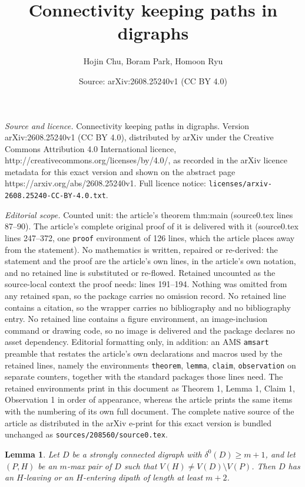 \documentclass[10pt,a4paper]{amsart}
\title{Connectivity keeping paths in digraphs}
\author{Hojin Chu, Boram Park, Homoon Ryu}
\date{Source: arXiv:2608.25240v1 (CC BY 4.0)}
\newtheorem{lemma}{Lemma}
\begin{document}
\maketitle

\noindent\emph{Source and licence.} Connectivity keeping paths in digraphs. Version arXiv:2608.25240v1 (CC BY 4.0), distributed by arXiv under the Creative Commons Attribution 4.0 International licence, http://creativecommons.org/licenses/by/4.0/, as recorded in the arXiv licence metadata for this exact version and shown on the abstract page https://arxiv.org/abs/2608.25240v1. Full licence notice: \texttt{licenses/arxiv-2608.25240-CC-BY-4.0.txt}.\par\smallskip

\noindent\textit{Editorial scope.} Counted unit: the article's theorem thm:main (source0.tex lines 87--90). The article's complete original proof of it is delivered with it (source0.tex lines 247--372, one \texttt{proof} environment of 126 lines, which the article places away from the statement). No mathematics is written, repaired or re-derived: the statement and the proof are the article's own lines, in the article's own notation, and no retained line is substituted or re-flowed.  Retained uncounted as the source-local context the proof needs: lines 191--194.  Nothing was omitted from any retained span, so the package carries no omission record.  No retained line contains a citation, so the wrapper carries no bibliography and no bibliography entry.  No retained line contains a figure environment, an image-inclusion command or drawing code, so no image is delivered and the package declares no asset dependency.  Editorial formatting only, in addition: an AMS \texttt{amsart} preamble that restates the article's own declarations and macros used by the retained lines, namely the environments \texttt{theorem}, \texttt{lemma}, \texttt{claim}, \texttt{observation} on separate counters, together with the standard packages those lines need.  The retained environments print in this document as Theorem 1, Lemma 1, Claim 1, Observation 1 in order of appearance, whereas the article prints the same items with the numbering of its own full document.  The complete native source of the article as distributed in the arXiv e-print for this exact version is bundled unchanged as \texttt{sources/208560/source0.tex}.
\begin{lemma}\label{lem:leaving-H}
Let $D$ be a strongly connected digraph with $\delta^0(D)\ge m+1$, and let $(P,H)$ be an $m$-max pair of $D$ such that $V(H)\ne V(D)\setminus V(P)$.
Then $D$ has an $H$-leaving or an $H$-entering dipath of length at least $m+2$.
\end{lemma}
\end{document}
